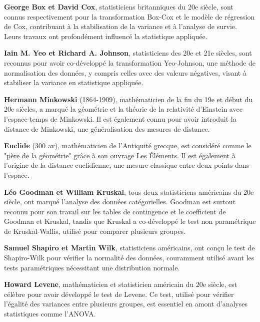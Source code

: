 \adjustmtc
\newpage
\renewcommand\bibname{Biographie}
\begin{thebibliography}{9}
\thispagestyle{MyStyle}

\textbf{George Box et David Cox}, statisticiens britanniques du 20e siècle, sont connus respectivement pour la transformation Box-Cox et le modèle de régression de Cox, contribuant à la stabilisation de la variance et à l'analyse de survie. Leurs travaux ont profondément influencé la statistique appliquée.

\textbf{Iain M. Yeo et Richard A. Johnson}, statisticiens des 20e et 21e siècles, sont reconnus pour avoir co-développé la transformation Yeo-Johnson, une méthode de normalisation des données, y compris celles avec des valeurs négatives, visant à stabiliser la variance en statistique appliquée.

\textbf{Hermann Minkowski} (1864-1909), mathématicien de la fin du 19e et début du 20e siècles, a marqué la géométrie et la théorie de la relativité d'Einstein avec l'espace-temps de Minkowski. Il est également connu pour avoir introduit la distance de Minkowski, une généralisation des mesures de distance.

\textbf{Euclide} (300 av), mathématicien de l'Antiquité grecque, est considéré comme le "père de la géométrie" grâce à son ouvrage Les Éléments. Il est également à l'origine de la distance euclidienne, une mesure classique entre deux points dans l'espace.

\textbf{Léo Goodman et William Kruskal}, tous deux statisticiens américains du 20e siècle, ont marqué l'analyse des données catégorielles. Goodman est surtout reconnu pour son travail sur les tables de contingence et le coefficient de Goodman et Kruskal, tandis que Kruskal a co-développé le test non paramétrique de Kruskal-Wallis, utilisé pour comparer plusieurs groupes.

\textbf{Samuel Shapiro et Martin Wilk}, statisticiens américains, ont conçu le test de Shapiro-Wilk pour vérifier la normalité des données, couramment utilisé avant les tests paramétriques nécessitant une distribution normale.

\textbf{Howard Levene}, mathématicien et statisticien américain du 20e siècle, est célèbre pour avoir développé le test de Levene. Ce test, utilisé pour vérifier l'égalité des variances entre plusieurs groupes, est essentiel en amont d'analyses statistiques comme l'ANOVA.


\end{thebibliography}

